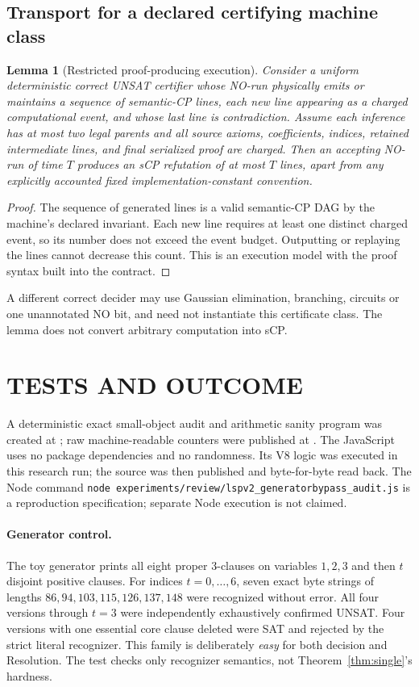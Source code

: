 \documentclass[11pt]{article}
\newtheorem{lemma}[theorem]{Lemma}
\begin{document}
\subsection{Transport for a declared certifying machine class}
\begin{lemma}[Restricted proof-producing execution]
\label{lem:certifying}
Consider a uniform deterministic correct UNSAT certifier whose NO-run
physically emits or maintains a sequence of semantic-CP lines,
each new line appearing as a charged computational event, and
whose last line is contradiction. Assume each inference has at most
two legal parents and all source axioms, coefficients, indices,
retained intermediate lines, and final serialized proof are
charged. Then an accepting NO-run of time $T$ produces an sCP
refutation of at most $T$ lines, apart from any explicitly
accounted fixed implementation-constant convention.
\end{lemma}
\begin{proof}
The sequence of generated lines is a valid semantic-CP DAG by
the machine's declared invariant. Each new line requires at
least one distinct charged event, so its number does not exceed
the event budget. Outputting or replaying the lines cannot
decrease this count. This is an execution model with the
proof syntax built into the contract.
\end{proof}
\noindent A different correct decider may use Gaussian elimination,
branching, circuits or one unannotated NO bit, and need not
instantiate this certificate class. The lemma does not
convert arbitrary computation into sCP.

\section{TESTS AND OUTCOME}
A deterministic exact small-object audit and arithmetic sanity
program was created at
;
raw machine-readable counters were published at
.
The JavaScript uses no package dependencies and no randomness.
Its V8 logic was executed in this research run; the source was
then published and byte-for-byte read back. The Node command
\texttt{node experiments/review/lspv2\_generatorbypass\_audit.js}
is a reproduction specification; separate Node execution is not
claimed.

\paragraph{Generator control.}
The toy generator prints all eight proper 3-clauses on variables
$1,2,3$ and then $t$ disjoint positive clauses. For indices
$t=0,\ldots,6$, seven exact byte strings of lengths
$86,94,103,115,126,137,148$ were recognized without error.
All four versions through $t=3$ were independently exhaustively
confirmed UNSAT. Four versions with one essential core clause
deleted were SAT and rejected by the strict literal recognizer.
This family is deliberately \emph{easy} for both decision and
Resolution. The test checks only recognizer semantics, not
Theorem~\ref{thm:single}'s hardness.
\end{document}
